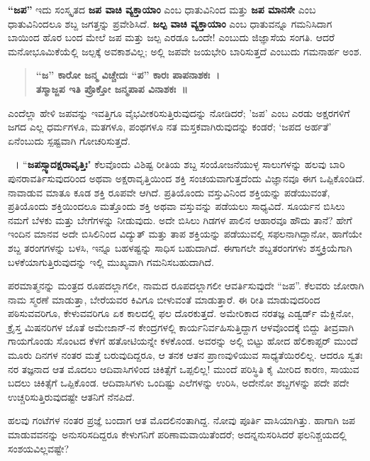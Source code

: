{\textbf{“ಜಪ”} ಇದು ಸಂಸ್ಕೃತದ \textbf{ಜಪ ವಾಚಿ ವ್ಯಕ್ತಾಯಾಂ} ಎಂಬ ಧಾತುವಿನಿಂದ ಮತ್ತು \textbf{ಜಪ ಮಾನಸೇ} ಎಂಬ ಧಾತುವಿನಿಂದಲೂ ಶಬ್ದ ಜಗತ್ತನ್ನು ಪ್ರವೇಶಿಸಿದೆ. \textbf{ಜಲ್ಪ ವಾಚಿ \-ವ್ಯಕ್ತಾಯಾಂ} ಎಂಬ ಧಾತುವನ್ನೂ ಗಮನಿಸಿದಾಗ ಬಾಯಿಂದ ಹೊರ ಬಂದ ಮೇಲೆ ಜಪ ಮತ್ತು ಜಲ್ಪ ಎರಡೂ ಒಂದೇ! ಎಂಬುದು ಜಿಜ್ಞಾಸೆಯ ಸಂಗತಿ. ಆದರೆ ಮನೋ\-ಭೂಮಿಕೆಯೆಲ್ಲಿ ಜಲ್ಪಕ್ಕೆ ಅವಕಾಶವಿಲ್ಲ; ಅಲ್ಲಿ ಜಪವೇ ಜಯಭೇರಿ ಬಾರಿಸುತ್ತದೆ ಎಂಬುದು ಗಮನಾರ್ಹ ಅಂಶ.
\begin{verse}
\textbf{“ಜ” ಕಾರೋ ಜನ್ಮ ವಿಚ್ಚೇದಃ “ಪ” ಕಾರಃ ಪಾಪನಾಶಕಃ~। \\
ತಸ್ಮಾಜ್ಜಪ ಇತಿ ಪ್ರೊಕ್ತೋ ಜನ್ಮಪಾಪ ವಿನಾಶಕಃ~॥}
\end{verse}
ಎಂದೆಲ್ಲಾ ಹೇಳಿ ಜಪವನ್ನು ಇವತ್ತಿಗೂ ವೈಭವೀಕರಿಸುತ್ತಿರುವುದನ್ನು ನೋಡಿದರೆ; ’ಜಪ’ ಎಂಬ ಎರಡು ಅಕ್ಷರಗಳಿಗೆ ಜಗದ ಎಲ್ಲ ಧರ್ಮಗಳೂ, ಮತಗಳೂ, ಪಂಥಗಳೂ ನತ ಮಸ್ತಕವಾಗಿರುವುದನ್ನು ಕಂಡರೆ; ‘ಜಪದ ಅರ್ಹತೆ’ ಏನೆಂಬುದು ಸ್ಪಷ್ಟವಾಗಿ ಗೋಚರಿಸುತ್ತದೆ.

~। “\textbf{ಜಪಸ್ಸ್ಯಾದಕ್ಷರಾವೃತ್ತಿಃ}" ಕೆಲವೊಂದು ವಿಶಿಷ್ಟ ರೀತಿಯ ಶಬ್ದ ಸಂಯೋಜನೆಯುಳ್ಳ ಸಾಲುಗಳನ್ನು ಹಲವು ಬಾರಿ ಪುನರಾವರ್ತಿಸುವುದರಿಂದ ಅಥವಾ ಅಕ್ಷರಾವೃತ್ತಿಯಿಂದ ಶಕ್ತಿ ಸಂಚಯವಾಗುತ್ತದೆಂದು ವಿಜ್ಞಾನವೂ ಈಗ ಒಪ್ಪಿಕೊಂಡಿದೆ. ನಾವಾಡುವ ಮಾತೂ ಕೂಡ ಶಕ್ತಿ ರೂಪವೇ ಆಗಿದೆ. ಪ್ರತಿಯೊಂದು ವಸ್ತುವಿನಿಂದ ಶಕ್ತಿಯನ್ನು ಪಡೆಯುವಂತೆ, ಪ್ರತಿಯೊಂದು ಶಕ್ತಿಯಿಂದಲೂ ಮತ್ತೊಂದು ಶಕ್ತಿ ಅಥವಾ ವಸ್ತುವನ್ನು ಪಡೆಯಲು ಸಾಧ್ಯವಿದೆ. ಸೂರ್ಯನ ಬಿಸಿಲು ನಮಗೆ ಬೆಳಕು ಮತ್ತು ಬೇಗೆಗಳನ್ನು ನೀಡುವುದು. ಅದೇ ಬಿಸಿಲು ಗಿಡಗಳ ಪಾಲಿನ ಆಹಾರವೂ ಹೌದು ತಾನೆ? ಹೇಗೆ ಇಂದಿನ ಮಾನವ ಅದೇ ಬಿಸಿಲಿನಿಂದ ವಿದ್ಯುತ್ ಮತ್ತು ತಾಪ ಶಕ್ತಿಯನ್ನು ಪಡೆಯುವಲ್ಲಿ ಸಫಲನಾಗಿದ್ದಾನೋ, ಹಾಗೆಯೇ ಶಬ್ದ ತರಂಗಗಳನ್ನು ಬಳಸಿ, ಇನ್ನೂ ಬಹಳಷ್ಟನ್ನು ಸಾಧಿಸ ಬಹುದಾಗಿದೆ. ಈಗಾಗಲೇ ಶಬ್ದತರಂಗಗಳು ಶಸ್ತ್ರಕ್ರಿಯೆಗಾಗಿ ಬಳಕೆಯಾಗುತ್ತಿರುವುದನ್ನು ಇಲ್ಲಿ ಮುಖ್ಯವಾಗಿ ಗಮನಿಸಬಹುದಾಗಿದೆ.

ಪರಮಾತ್ಮನನ್ನು ಮಂತ್ರದ ರೂಪದಲ್ಲಾಗಲೀ, ನಾಮದ ರೂಪದಲ್ಲಾಗಲೀ ಆವರ್ತಿ\-ಸುವುದೇ “ಜಪ”. ಕೆಲವರು ಜೋರಾಗಿ ನಾಮ ಸ್ಮರಣೆ ಮಾಡುತ್ತಾ, ಬೇರೆಯವರ ಕಿವಿಗೂ ಬೀಳುವಂತೆ ಮಾಡುತ್ತಾರೆ. ಈ ರೀತಿ ಮಾಡುವುದರಿಂದ ಪಠಿಸುವವರಿಗೂ, ಕೇಳುವವರಿಗೂ ಏಕ ಕಾಲದಲ್ಲಿ ಫಲ ದೊರಕುತ್ತದೆ. ಅಮೇರಿಕಾದ ನರತಜ್ಞ ಎಡ್ವರ್ಡ್ ಮೆಕ್ಲಿನೋ, ಕ್ರೈಸ್ತ ಮಿಷನರಿಗಳ ಜೊತೆ ಅಮೇಜಾನ್-ನ ಕೇಂದ್ರಗಳಲ್ಲಿ ಕಾರ್ಯನಿರ್ವ\-ಹಿಸುತ್ತಿದ್ದಾಗ ಆಳವೊಂದಕ್ಕೆ ಬಿದ್ದು ತೀವ್ರವಾಗಿ ಗಾಯಗೊಂಡು ಸೊಂಟದ ಕೆಳಗೆ ಹತೋಟಿ\-ಯನ್ನೇ ಕಳಕೊಂಡ. ಅವರನ್ನು ಅಲ್ಲಿ ಬಿಟ್ಟು ಹೋದ ಹೆಲಿಕಾಪ್ಟರ್ ಮುಂದೆ ಮೂರು ದಿನಗಳ ನಂತರ ಮತ್ತೆ ಬರುವುದಿದ್ದರೂ, ಆ ತನಕ ಆತನ ಪ್ರಾಣವುಳಿಯುವ ಸಾಧ್ಯತೆಯಿರಲಿಲ್ಲ. ಆದರೂ ಸ್ವತಃ ನರ ತಜ್ಞನಾದ ಆತ ಮೊದಲು ಆದಿವಾಸಿಗಳಿಂದ ಚಿಕಿತ್ಸೆಗೆ ಒಪ್ಪಲಿಲ್ಲ! ಮುಂದೆ ಪರಿಸ್ಥಿತಿ ಕೈ ಮೀರಿದ ಕಾರಣ, ಸಾಯುವ ಬದಲು ಚಿಕಿತ್ಸೆಗೆ ಒಪ್ಪಿಕೊಂಡ. ಆದಿವಾಸಿಗಳು ಒಂದಿಷ್ಟು ಎಲೆಗಳನ್ನು ಉರಿಸಿ, ಅದೇನೋ ಶಬ್ದಗಳನ್ನು ಪದೇ ಪದೇ ಉಚ್ಚರಿಸುತ್ತಿರುವುದಷ್ಟೇ ಆತನಿಗೆ ನೆನಪಿದೆ. 

ಹಲವು ಗಂಟೆಗಳ ನಂತರ ಪ್ರಜ್ಞೆ ಬಂದಾಗ ಆತ ಮೊದಲಿನಂತಾಗಿದ್ದ. ನೋವು ಪೂರ್ತಿ ವಾಸಿಯಾಗಿತ್ತು. ಹಾಗಾಗಿ ಜಪ ಮಾಡುವವನನ್ನು ಅನುಸರಿಸದಿದ್ದರೂ ಕೇಳುಗನಿಗೆ ಪರಿಣಾಮವಾಯಿತೆಂದರೆ; ಅದನ್ನನುಸರಿಸಿದರೆ ಫಲನಿಶ್ಚಯದಲ್ಲಿ ಸಂಶಯವಿಲ್ಲವಷ್ಟೇ?

}
